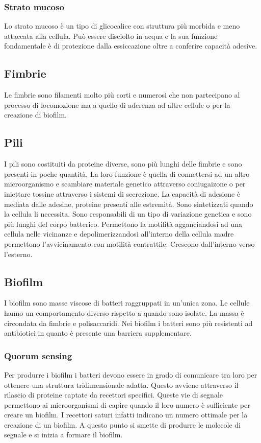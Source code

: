 		\subsubsection{Strato mucoso}
		Lo strato mucoso \`e un tipo di glicocalice con struttura pi\`u morbida e meno attaccata alla cellula.
		Pu\`o essere disciolto in acqua e la sua funzione fondamentale \`e di protezione dalla essiccazione oltre a conferire capacit\`a adesive.

	\subsection{Fimbrie}
	Le fimbrie sono filamenti molto pi\`u corti e numerosi che non partecipano al processo di locomozione ma a quello di aderenza ad altre cellule o per la creazione di biofilm.

	\subsection{Pili}
	I pili sono costituiti da proteine diverse, sono pi\`u lunghi delle fimbrie e sono presenti in poche quantit\`a.
	La loro funzione \`e quella di connettersi ad un altro microorganismo e scambiare materiale genetico attraverso coniugaizone o per iniettare tossine attraverso i sistemi di secrezione.
	La capacit\`a di adesione \`e mediata dalle adesine, proteine presenti alle estremit\`a.
	Sono sintetizzati quando la cellula li necessita.
	Sono responsabili di un tipo di variazione genetica e sono pi\`u lunghi del corpo batterico.
	Permettono la motilit\`a agganciandosi ad una cellula nelle vicinanze e depolimerizzandosi all'interno della cellula madre permettono l'avvicinamento con motilit\`a contrattile.
	Crescono dall'interno verso l'esterno.

	\subsection{Biofilm}
	I biofilm sono masse viscose di batteri raggruppati in un'unica zona.
	Le cellule hanno un comportamento diverso rispetto a quando sono isolate.
	La massa \`e circondata da fimbrie e polisaccaridi.
	Nei biofilm i batteri sono pi\`u resistenti ad antibiotici in quanto \`e presente una barriera supplementare.

		\subsubsection{Quorum sensing}
		Per produrre i biofilm i batteri devono essere in grado di comunicare tra loro per ottenere una struttura tridimensionale adatta.
		Questo avviene attraverso il rilascio di proteine captate da recettori specifici.
		Queste vie di segnale permettono ai microorganismi di capire quando il loro numero \`e sufficiente per creare un biofilm.
		I recettori saturi infatti indicano un numero ottimale per la creazione di un biofilm.
		A questo punto si smette di produrre le molecole di segnale e si inizia a formare il biofilm.

